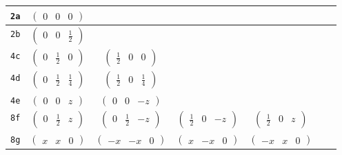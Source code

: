 \documentclass[fleqn,9pt,landscape]{jsarticle}
\begin{document}
\begin{center}
\begin{longtable}{ccccccc}
{\tt 2a} & $ \begin{pmatrix} 0 & 0 & 0 \end{pmatrix} $ & $  $ & $  $ & $  $ & $  $ & $  $ \\ \hline
{\tt 2b} & $ \begin{pmatrix} 0 & 0 & \frac{1}{2} \end{pmatrix} $ & $  $ & $  $ & $  $ & $  $ & $  $ \\ \hline
{\tt 4c} & $ \begin{pmatrix} 0 & \frac{1}{2} & 0 \end{pmatrix} $ & $ \begin{pmatrix} \frac{1}{2} & 0 & 0 \end{pmatrix} $ & $  $ & $  $ & $  $ & $  $ \\ \hline
{\tt 4d} & $ \begin{pmatrix} 0 & \frac{1}{2} & \frac{1}{4} \end{pmatrix} $ & $ \begin{pmatrix} \frac{1}{2} & 0 & \frac{1}{4} \end{pmatrix} $ & $  $ & $  $ & $  $ & $  $ \\ \hline
{\tt 4e} & $ \begin{pmatrix} 0 & 0 & z \end{pmatrix} $ & $ \begin{pmatrix} 0 & 0 & - z \end{pmatrix} $ & $  $ & $  $ & $  $ & $  $ \\ \hline
{\tt 8f} & $ \begin{pmatrix} 0 & \frac{1}{2} & z \end{pmatrix} $ & $ \begin{pmatrix} 0 & \frac{1}{2} & - z \end{pmatrix} $ & $ \begin{pmatrix} \frac{1}{2} & 0 & - z \end{pmatrix} $ & $ \begin{pmatrix} \frac{1}{2} & 0 & z \end{pmatrix} $ & $  $ & $  $ \\ \hline
{\tt 8g} & $ \begin{pmatrix} x & x & 0 \end{pmatrix} $ & $ \begin{pmatrix} - x & - x & 0 \end{pmatrix} $ & $ \begin{pmatrix} x & - x & 0 \end{pmatrix} $ & $ \begin{pmatrix} - x & x & 0 \end{pmatrix} $ & $  $ & $  $ \\ \hline

\end{longtable}
\end{center}
\end{document}
